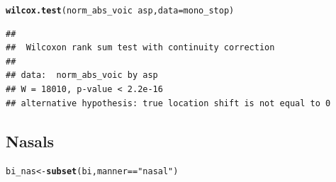 \documentclass[a4paper,11pt]{article}\usepackage[]{graphicx}\usepackage[]{color}
\makeatletter
\newcommand{\hlstr}[1]{\textcolor[rgb]{0.192,0.494,0.8}{#1}}%
\newcommand{\hlopt}[1]{\textcolor[rgb]{0,0,0}{#1}}%
\newcommand{\hlstd}[1]{\textcolor[rgb]{0.345,0.345,0.345}{#1}}%
\newcommand{\hlkwb}[1]{\textcolor[rgb]{0.69,0.353,0.396}{#1}}%
\newcommand{\hlkwc}[1]{\textcolor[rgb]{0.333,0.667,0.333}{#1}}%
\newcommand{\hlkwd}[1]{\textcolor[rgb]{0.737,0.353,0.396}{\textbf{#1}}}%
\newenvironment{kframe}{%
 \def\at@end@of@kframe{}%
 \ifinner\ifhmode%
  \def\at@end@of@kframe{\end{minipage}}%
  \begin{minipage}{\columnwidth}%
 \fi\fi%
 \def\FrameCommand##1{\hskip\@totalleftmargin \hskip-\fboxsep
 \colorbox{shadecolor}{##1}\hskip-\fboxsep
     \hskip-\linewidth \hskip-\@totalleftmargin \hskip\columnwidth}%
 \MakeFramed {\advance\hsize-\width
   \@totalleftmargin\z@ \linewidth\hsize
   \@setminipage}}%
 {\par\unskip\endMakeFramed%
 \at@end@of@kframe}
\newenvironment{knitrout}{}{} %
\makeatother
\begin{document}
\begin{knitrout}
\color{fgcolor}\begin{kframe}
\begin{alltt}
\hlkwd{wilcox.test}\hlstd{(norm_abs_voic} \hlopt{~} \hlstd{asp,} \hlkwc{data} \hlstd{= mono_stop)}
\end{alltt}
\begin{verbatim}
## 
## 	Wilcoxon rank sum test with continuity correction
## 
## data:  norm_abs_voic by asp
## W = 18010, p-value < 2.2e-16
## alternative hypothesis: true location shift is not equal to 0
\end{verbatim}
\end{kframe}
\end{knitrout}

\subsection{Nasals}

\begin{knitrout}
\color{fgcolor}\begin{kframe}
\begin{alltt}
\hlstd{bi_nas} \hlkwb{<-} \hlkwd{subset}\hlstd{(bi, manner} \hlopt{==} \hlstr{"nasal"}\hlstd{)}
\end{alltt}
\end{kframe}
\end{knitrout}
\end{document}
